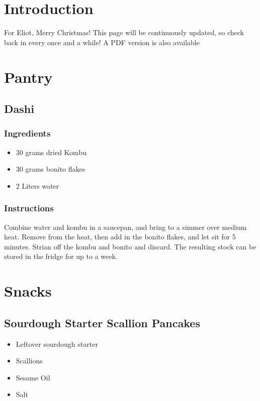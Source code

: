 \documentclass[11pt]{article}
\author{Reed Mullanix}
\date{\today}
\title{}
\begin{document}
\setcounter{tocdepth}{2}
\tableofcontents


\section{Introduction}
\label{sec:orgfe8c863}
For Eliot, Merry Christmas! This page will be continuously updated, so
check back in every once and a while! A PDF version is also available

\section{Pantry}
\label{sec:org1e01655}
\subsection{Dashi}
\label{sec:org1e7046f}
\subsubsection{Ingredients}
\label{sec:org6d6f8ff}
\begin{itemize}
\item 30 grams dried Kombu
\item 30 grams bonito flakes
\item 2 Liters water
\end{itemize}
\subsubsection{Instructions}
\label{sec:org599bdcf}
Combine water and kombu in a saucepan, and bring to a simmer over
medium heat. Remove from the heat, then add in the bonito flakes,
and let sit for 5 minutes. Strian off the kombu and bonito and
discard. The resulting stock can be stored in the fridge for up to
a week.
\section{Snacks}
\label{sec:org0588869}
\subsection{Sourdough Starter Scallion Pancakes}
\label{sec:orgcf080ec}
\begin{itemize}
\item Leftover sourdough starter
\item Scallions
\item Sesame Oil
\item Salt
\end{itemize}
\end{document}

